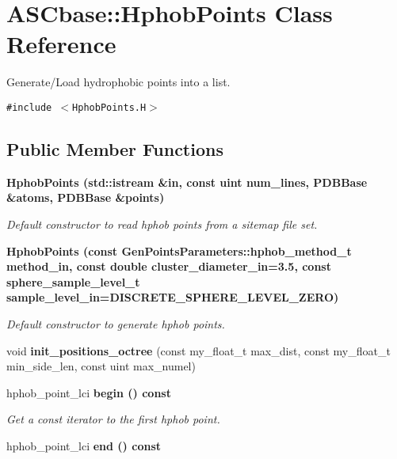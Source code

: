 \section{ASCbase::Hphob\-Points Class Reference}
\label{classASCbase_1_1HphobPoints}
Generate/Load hydrophobic points into a list.  


{\tt \#include $<$Hphob\-Points.H$>$}

\subsection*{Public Member Functions}
\begin{CompactItemize}
\item 
\bf{Hphob\-Points} (std::istream \&in, const uint num\_\-lines, \bf{PDBBase} \&atoms, \bf{PDBBase} \&points)\label{classASCbase_1_1HphobPoints_1b600a08832fe2d624022f19b9e1cbf4}

\begin{CompactList}\small\item\em Default constructor to read hphob points from a sitemap file set. \item\end{CompactList}\item 
\bf{Hphob\-Points} (const \bf{Gen\-Points\-Parameters::hphob\_\-method\_\-t} method\_\-in, const double cluster\_\-diameter\_\-in=3.5, const sphere\_\-sample\_\-level\_\-t sample\_\-level\_\-in=DISCRETE\_\-SPHERE\_\-LEVEL\_\-ZERO)\label{classASCbase_1_1HphobPoints_570ce01d0cd1e8f1d59b93a48a2d4beb}

\begin{CompactList}\small\item\em Default constructor to generate hphob points. \item\end{CompactList}\item 
void \textbf{init\_\-positions\_\-octree} (const my\_\-float\_\-t max\_\-dist, const my\_\-float\_\-t min\_\-side\_\-len, const uint max\_\-numel)\label{classASCbase_1_1HphobPoints_07a9f3bb6d8abbbcb7622e420f912bfc}

\item 
hphob\_\-point\_\-lci \bf{begin} () const \label{classASCbase_1_1HphobPoints_5f178bbf8869f527b842cbda666e8348}

\begin{CompactList}\small\item\em Get a const iterator to the first hphob point. \item\end{CompactList}\item 
hphob\_\-point\_\-lci \bf{end} () const \label{classASCbase_1_1HphobPoints_980fffa0fabdd65b40ceec84c06067fc}


\end{CompactItemize}
